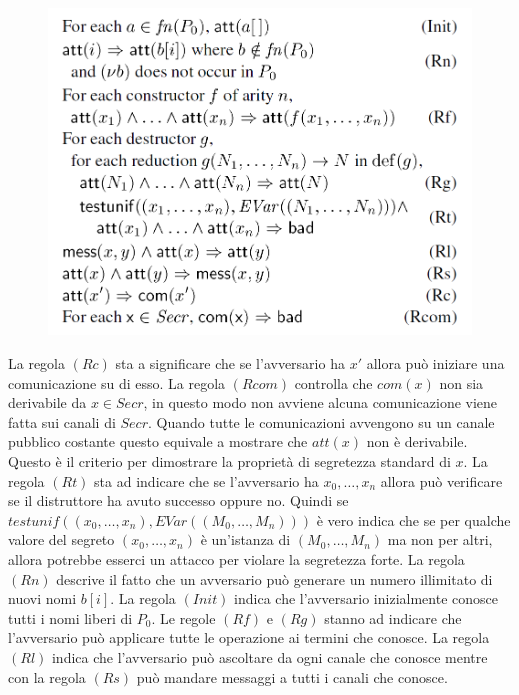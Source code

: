\documentclass[12pt]{article}
\begin{document}
\begin{figure}[h]
    \centering
    \includegraphics[scale=0.5]{Relazione/Immagini/term_rule.PNG}
\end{figure}
La regola $(Rc)$ sta a significare che se l'avversario ha $x'$ allora può iniziare una comunicazione su di esso. La regola $(Rcom)$ controlla che $com(x)$ non sia derivabile da $x \in Secr$, in questo modo non avviene alcuna comunicazione viene fatta sui canali di  $Secr$. Quando tutte le comunicazioni avvengono su un canale pubblico costante questo equivale a mostrare che $att(x)$ non è derivabile. Questo è il criterio per dimostrare la proprietà di segretezza standard di $x$. La regola $(Rt)$ sta ad indicare che se l'avversario ha $x_0,\dots,x_n$ allora può verificare se il distruttore ha avuto successo oppure no. Quindi se $testunif((x_0,\dots,x_n),EVar((M_0,\dots,M_n)))$ è vero indica che se per qualche valore del segreto $(x_0,\dots,x_n)$ è un'istanza di $(M_0,\dots,M_n)$ ma non per altri, allora potrebbe esserci un attacco per violare la segretezza forte. La regola $(Rn)$ descrive il fatto che un avversario può generare un numero illimitato di nuovi nomi $b[i]$. La regola $(Init)$ indica che l'avversario inizialmente conosce tutti i nomi liberi di $P_0$. Le regole $(Rf)$ e $(Rg)$ stanno ad indicare che l'avversario può applicare tutte le operazione ai termini che conosce. La regola $(Rl)$ indica che l'avversario può ascoltare da ogni canale che conosce mentre con la regola $(Rs)$ può mandare messaggi a tutti i canali che conosce.\\
\end{document}
